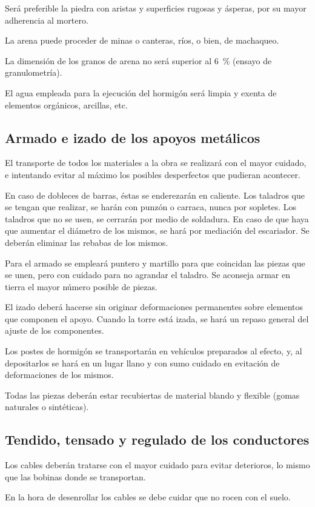 Será preferible la piedra con aristas y superficies rugosas y ásperas, por su mayor adherencia al mortero.

La arena puede proceder de minas o canteras, ríos, o bien, de machaqueo.

La dimensión de los granos de arena no será superior al \SI{6}{\percent} (ensayo de granulometría).

El agua empleada para la ejecución del hormigón será limpia y exenta de elementos orgánicos, arcillas, etc.
\subsection{Armado e izado de los apoyos metálicos}
\label{subsec:pliego-izadoCT}
El transporte de todos los materiales a la obra se realizará con el mayor cuidado, e intentando evitar al máximo los posibles desperfectos que pudieran acontecer.

En caso de dobleces de barras, éstas se enderezarán en caliente. Los taladros que se tengan que realizar, se harán con punzón o carraca, nunca por sopletes. Los taladros que no se usen, se cerrarán por medio de soldadura. En caso de que haya que aumentar el diámetro de los mismos, se hará por mediación del escariador. Se deberán eliminar las rebabas de los mismos.

Para el armado se empleará puntero y martillo para que coincidan las piezas que se unen, pero con cuidado para no agrandar el taladro.
Se aconseja armar en tierra el mayor número posible de piezas.

El izado deberá hacerse sin originar deformaciones permanentes sobre elementos que componen el apoyo.
Cuando la torre está izada, se hará un repaso general del ajuste de los componentes.

Los postes de hormigón se transportarán en vehículos preparados al efecto, y, al depositarlos se hará en un lugar llano y con sumo cuidado en evitación de deformaciones de los mismos.

Todas las piezas deberán estar recubiertas de material blando y flexible (gomas naturales o sintéticas).
\subsection{Tendido, tensado y regulado de los conductores}
\label{subsec:pliego-tendidoCT}
Los cables deberán tratarse con el mayor cuidado para evitar deterioros, lo mismo que las bobinas donde se transportan.

En la hora de desenrollar los cables se debe cuidar que no rocen con el suelo.

